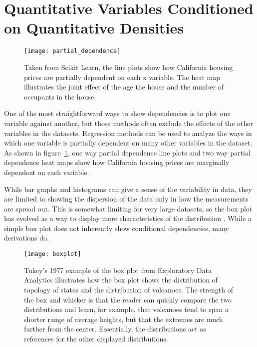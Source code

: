 \documentclass[../main.tex]{subfiles}
\begin{document}
\section{Quantitative Variables Conditioned on Quantitative Densities}


\begin{figure}
  \texttt{[image: partial\_dependence]}
  \caption{Taken from Scikit Learn\cite{_partial_????}, the line plots show how California housing prices are partially dependent on each x variable. The heat map illustrates the joint effect of the age the house and the number of occupants in the house.}
  \label{fig:partialdependence}
\end{figure}


One of the most straightforward ways to show dependencies is to plot one
variable against another, but those methods often exclude the effects of the
other variables in the datasets. Regression methods can be used to analyze the
ways in which one variable is partially dependent on many other variables in
the dataset\cite{_elements_2009}. As shown in figure~\ref{fig:partialdependence}, one way partial dependence line plots and two way partial dependence heat maps show how California housing prices are marginally dependent on each variable. 

While bar graphs and histograms can give a sense of the variability in
data, they are limited to showing the dispersion of the data only in how the measurements are spread out. This is somewhat limiting for very large datasets, so the box plot has evolved as a way to display more characteristics of the distribution \cite{wickham_40_2011}. While a simple box plot does not inherently show conditional dependencies, many derivations do. 

\begin{figure}
  \texttt{[image: boxplot]}
  \caption{Tukey's 1977 example of the box plot from
    Exploratory Data Analytics\cite{tukey_exploratory_1977} illustrates how the box plot shows the distribution of topology of states and
    the distribution of volcanoes. The strength of the box and whisker is that the
    reader can quickly compare the two distributions and learn, for example,
    that volcanoes tend to span a shorter range of average heights, but that the
    extremes are much further from the center. Essentially, the distributions act as references for the other displayed distributions.}
  \label{fig:boxplot}
\end{figure}
\end{document}
